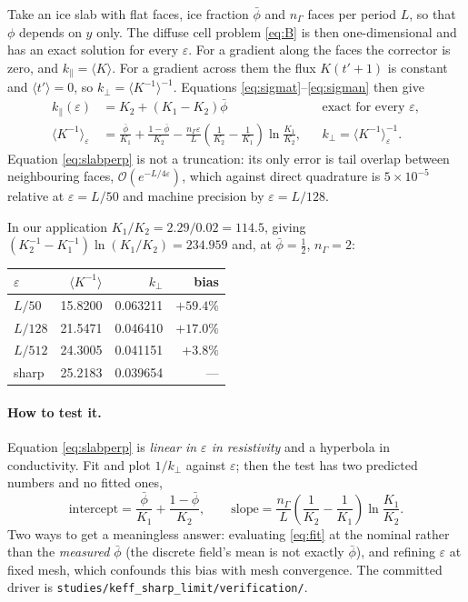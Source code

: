 \documentclass[11pt]{article}
\newcommand{\Gam}{\Gamma}
\newcommand{\avg}[1]{\big\langle #1 \big\rangle}
\begin{document}
Take an ice slab with flat faces, ice fraction $\bar\phi$ and $n_\Gam$ faces
per period $L$, so that $\phi$ depends on $y$ only. The diffuse cell problem
\eqref{eq:B} is then one-dimensional and has an exact solution for every
$\varepsilon$. For a gradient along the faces the corrector is zero, and
$k_\parallel=\avg{K}$. For a gradient across them the flux $K(t'+1)$ is constant
and $\avg{t'}=0$, so $k_\perp=\avg{K^{-1}}^{-1}$. Equations
\eqref{eq:sigmat}--\eqref{eq:sigman} then give
\begin{align}
k_\parallel(\varepsilon)&=K_2+(K_1-K_2)\bar\phi
&&\text{exact for every }\varepsilon,
\label{eq:slabpar}\\
\avg{K^{-1}}_\varepsilon&=\frac{\bar\phi}{K_1}+\frac{1-\bar\phi}{K_2}
-\frac{n_\Gam\varepsilon}{L}\left(\frac{1}{K_2}-\frac{1}{K_1}\right)\ln\frac{K_1}{K_2},
&&k_\perp=\avg{K^{-1}}_\varepsilon^{-1}.
\label{eq:slabperp}
\end{align}
Equation \eqref{eq:slabperp} is not a truncation: its only error is tail overlap
between neighbouring faces, $\mathcal O(e^{-L/4\varepsilon})$, which against
direct quadrature is $5\times10^{-5}$ relative at $\varepsilon=L/50$ and machine
precision by $\varepsilon=L/128$.

In our application $K_1/K_2=2.29/0.02=114.5$, giving
$(K_2^{-1}-K_1^{-1})\ln(K_1/K_2)=234.959$ and, at $\bar\phi=\tfrac12$,
$n_\Gam=2$:

\begin{center}
\begin{tabular}{@{}lrrr@{}}
\toprule
$\varepsilon$ & $\avg{K^{-1}}$ & $k_\perp$ & bias \\
\midrule
$L/50$  & 15.8200 & 0.063211 & $+59.4\%$ \\
$L/128$ & 21.5471 & 0.046410 & $+17.0\%$ \\
$L/512$ & 24.3005 & 0.041151 & $+3.8\%$ \\
sharp   & 25.2183 & 0.039654 & --- \\
\bottomrule
\end{tabular}
\end{center}

\paragraph{How to test it.} Equation \eqref{eq:slabperp} is \emph{linear in
$\varepsilon$ in resistivity} and a hyperbola in conductivity. Fit and plot
$1/k_\perp$ against $\varepsilon$; then the test has two predicted numbers and no
fitted ones,
\begin{equation}
\text{intercept}=\frac{\bar\phi}{K_1}+\frac{1-\bar\phi}{K_2},
\qquad
\text{slope}=\frac{n_\Gam}{L}\left(\frac{1}{K_2}-\frac{1}{K_1}\right)\ln\frac{K_1}{K_2}.
\label{eq:fit}
\end{equation}
Two ways to get a meaningless answer: evaluating \eqref{eq:fit} at the nominal
rather than the \emph{measured} $\bar\phi$ (the discrete field's mean is not
exactly $\bar\phi$), and refining $\varepsilon$ at fixed mesh, which
confounds this bias with mesh convergence. The committed driver is
\verb|studies/keff_sharp_limit/verification/|.
\end{document}

